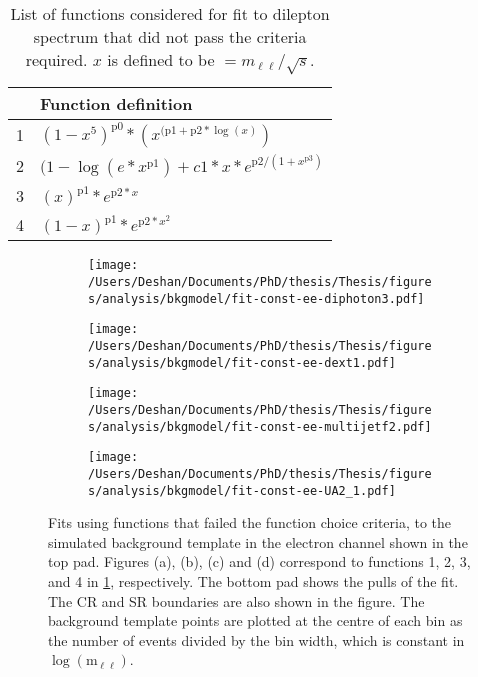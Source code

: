 \begin{table}[h!]
    \centering
    \begin{tabular}{c|l}
         & Function definition \\
        \hline\hline 
        1 & $(1 - x^{5})^{\text{p0}}*(x^{(\text{p1} + \text{p2}*\log(x)})$ \\
        2 & $(1-\log(e*x^{\text{p1}})+c1*x*e^{\text{p2}/(1+x^{\text{p3}})}$ \\
        3 & $(x)^{\text{p1}}*e^{\text{p2}*x}$\\
        4 & $(1-x)^{\text{p1}}*e^{\text{p2}*x^2}$ \\
    \end{tabular}
    \caption[List of functions considered for the background fit]{List of functions considered for fit to dilepton spectrum that did not pass the criteria required. $x$ is defined to be $= m_{\ell\ell}/\sqrt{s}$. }
    \label{tab:bkgmodel:functions}
\end{table}

\begin{figure}[h!]
    \centering
    \begin{subfigure}[b]{0.49\textwidth}
        \centering
        \texttt{[image: /Users/Deshan/Documents/PhD/thesis/Thesis/figures/analysis/bkgmodel/fit-const-ee-diphoton3.pdf]}
        \caption{}
        \label{fig:bkgmodel:fitstoMC3}
    \end{subfigure}
    \begin{subfigure}[b]{0.49\textwidth}
        \centering
        \texttt{[image: /Users/Deshan/Documents/PhD/thesis/Thesis/figures/analysis/bkgmodel/fit-const-ee-dext1.pdf]}
        \caption{}
        \label{fig:bkgmodel:fitstoMC4}
    \end{subfigure}
    \begin{subfigure}[b]{0.49\textwidth}
        \centering
        \texttt{[image: /Users/Deshan/Documents/PhD/thesis/Thesis/figures/analysis/bkgmodel/fit-const-ee-multijetf2.pdf]}
        \caption{}
        \label{fig:bkgmodel:fitstoMC5}
    \end{subfigure}
    \begin{subfigure}[b]{0.49\textwidth}
        \centering
        \texttt{[image: /Users/Deshan/Documents/PhD/thesis/Thesis/figures/analysis/bkgmodel/fit-const-ee-UA2\_1.pdf]}
        \caption{}
        \label{fig:bkgmodel:fitstoMC6}
    \end{subfigure}
    \caption[Fits to the simulated background template in the electron and muon channels using functions that did not pass the selection criteria]{Fits using functions that failed the function choice criteria, to the simulated background template in the electron channel shown in the top pad. Figures (a), (b), (c) and (d) correspond to functions 1, 2, 3, and 4 in \cref{tab:bkgmodel:functions}, respectively. The bottom pad shows the pulls of the fit. The CR and SR boundaries are also shown in the figure. The background template points are plotted at the centre of each bin as the number of events divided by the bin width, which is constant in $\log{(\text{m}_{\ell\ell})}$.}
    \label{fig:bkgmodel:badfitstomc}
\end{figure}
\clearpage

